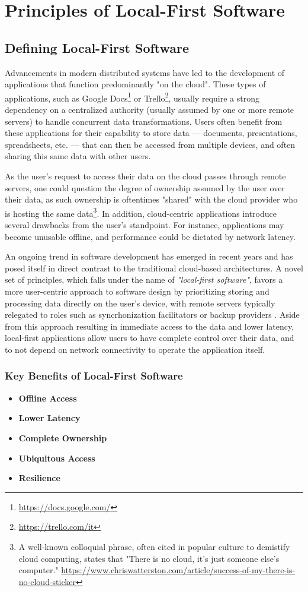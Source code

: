 \chapter{Principles of Local-First Software}

\section{Defining Local-First Software}
Advancements in modern distributed systems have led to the development of applications that
function predominantly "on the cloud". These types of applications, such as Google
Docs\footnote{\url{https://docs.google.com/}} or
Trello\footnote{\url{https://trello.com/it}}, usually require a strong dependency on a
centralized authority (usually assumed by one or more remote servers) to handle concurrent
data transformations. Users often benefit from these applications for their capability to
store data --- documents, presentations, spreadsheets, etc. --- that can then be accessed
from multiple devices, and often sharing this same data with other users.

As the user's request to access their data on the cloud passes through remote servers, one
could question the degree of ownership assumed by the user over their data, as such
ownership is oftentimes "shared" with the cloud provider who is hosting the same
data\footnote{
    A well-known colloquial phrase, often cited in popular culture to demistify cloud
    computing, states that "There is no cloud, it's just someone else's computer."
    \url{https://www.chriswatterston.com/article/success-of-my-there-is-no-cloud-sticker}
}. In addition, cloud-centric applications introduce several drawbacks from the user's
standpoint. For instance, applications may become unusable offline, and performance could be
dictated by network latency.

An ongoing trend in software development has emerged in recent years and has posed itself in
direct contrast to the traditional cloud-based architectures. A novel set of principles,
which falls under the name of \textit{"local-first software"}, favors a more user-centric
approach to software design by prioritizing storing and processing data directly on
the user's device, with remote servers typically relegated to roles such as syncrhonization
facilitators or backup providers \cite{kleppmann2019local}. Aside from this approach
resulting in immediate access to the data and lower latency, local-first applications allow
users to have complete control over their data, and to not depend on network connectivity to
operate the application itself.

\subsection{Key Benefits of Local-First Software}
\begin{itemize}
    \item \textbf{Offline Access}
    \item \textbf{Lower Latency}
    \item \textbf{Complete Ownership}
    \item \textbf{Ubiquitous Access}
    \item \textbf{Resilience}
\end{itemize}
